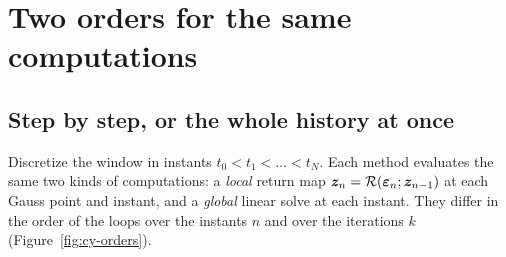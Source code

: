 \section{Two orders for the same computations}\label{sec:cy-orders}
%
\subsection{Step by step, or the whole history at once}
Discretize the window in instants $t_0<t_1<\dots<t_N$. Each method evaluates
the same two kinds of computations: a \emph{local} return map
$\bm{z}_n=\mathcal R(\bm{\varepsilon}_n;\bm{z}_{n-1})$ at each Gauss point and instant, and a
\emph{global} linear solve at each instant. They differ in the order of the
loops over the instants $n$ and over the iterations $k$
(Figure~\ref{fig:cy-orders}).

